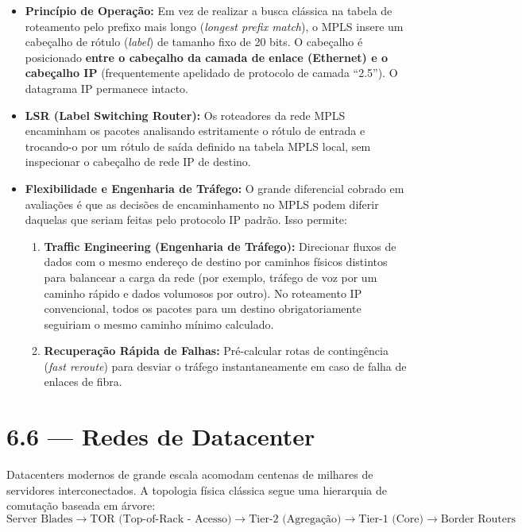 \documentclass[11pt,a4paper]{article}
\begin{document}
\begin{itemize}
    \item \textbf{Princípio de Operação:} Em vez de realizar a busca clássica na tabela de roteamento pelo prefixo mais longo (\emph{longest prefix match}), o MPLS insere um cabeçalho de rótulo (\emph{label}) de tamanho fixo de 20 bits. O cabeçalho é posicionado \textbf{entre o cabeçalho da camada de enlace (Ethernet) e o cabeçalho IP} (frequentemente apelidado de protocolo de camada ``2.5''). O datagrama IP permanece intacto.
    \item \textbf{LSR (Label Switching Router):} Os roteadores da rede MPLS encaminham os pacotes analisando estritamente o rótulo de entrada e trocando-o por um rótulo de saída definido na tabela MPLS local, sem inspecionar o cabeçalho de rede IP de destino.
    \item \textbf{Flexibilidade e Engenharia de Tráfego:} O grande diferencial cobrado em avaliações é que as decisões de encaminhamento no MPLS podem diferir daquelas que seriam feitas pelo protocolo IP padrão. Isso permite:
    \begin{enumerate}
        \item \textbf{Traffic Engineering (Engenharia de Tráfego):} Direcionar fluxos de dados com o mesmo endereço de destino por caminhos físicos distintos para balancear a carga da rede (por exemplo, tráfego de voz por um caminho rápido e dados volumosos por outro). No roteamento IP convencional, todos os pacotes para um destino obrigatoriamente seguiriam o mesmo caminho mínimo calculado.
        \item \textbf{Recuperação Rápida de Falhas:} Pré-calcular rotas de contingência (\emph{fast reroute}) para desviar o tráfego instantaneamente em caso de falha de enlaces de fibra.
    \end{enumerate}
\end{itemize}

\hrulefill

\section{6.6 --- Redes de Datacenter}

Datacenters modernos de grande escala acomodam centenas de milhares de servidores interconectados. A topologia física clássica segue uma hierarquia de comutação baseada em árvore:
\[
\text{Server Blades} \to \text{TOR (Top-of-Rack - Acesso)} \to \text{Tier-2 (Agregação)} \to \text{Tier-1 (Core)} \to \text{Border Routers}
\]
\end{document}
